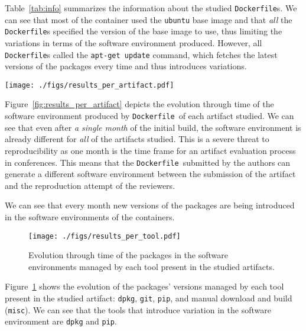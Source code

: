 \documentclass[sigconf,natbib=false]{acmart}
\newcommand{\df}{\texttt{Dockerfile}}
\begin{document}
Table~\ref{tab:info} summarizes the information about the studied \df s.
We can see that most of the container used the \texttt{ubuntu} base image and that \emph{all} the \df s specified the version of the base image to use, thus limiting the variations in terms of the software environment produced.
However, all \df s called the \texttt{apt-get update} command, which fetches the latest versions of the packages every time and thus introduces variations.

\begin{figure*}
  \centering
  \texttt{[image: ./figs/results\_per\_artifact.pdf]}
  \caption{
    Evolution of the packages in the software environment of each container through time.
    Each container has been rebuilt once a month.
    The color of the bar corresponds to the month when a specific version of a package has been introduced in the software environment.
    We can see that the proportion of package versions similar to the versions in the initial build is decreasing through the months.
  }
  \label{fig:results_per_artifact}
\end{figure*}

Figure~\ref{fig:results_per_artifact} depicts the evolution through time of the software environment produced by \df\ of each artifact studied.
We can see that even after \emph{a single month} of the initial build, the software environment is already different for \emph{all} of the artifacts studied.
This is a severe threat to reproducibility as one month is the time frame for an artifact evaluation process in conferences.
This means that the \df\ submitted by the authors can generate a different software environment between the submission of the artifact and the reproduction attempt of the reviewers.


We can see that every month new versions of the packages are being introduced in the software environments of the containers.



\begin{figure}
  \centering
  \texttt{[image: ./figs/results\_per\_tool.pdf]}
  \caption{
    Evolution through time of the packages in the software environments managed by each tool present in the studied artifacts.
  }\label{fig:results_per_tool}
\end{figure}

Figure~\ref{fig:results_per_tool} shows the evolution of the packages' versions managed by each tool present in the studied artifact: \texttt{dpkg}, \texttt{git}, \texttt{pip}, and manual download and build (\texttt{misc}).
We can see that the tools that introduce variation in the software environment are \texttt{dpkg} and \texttt{pip}.
\end{document}

